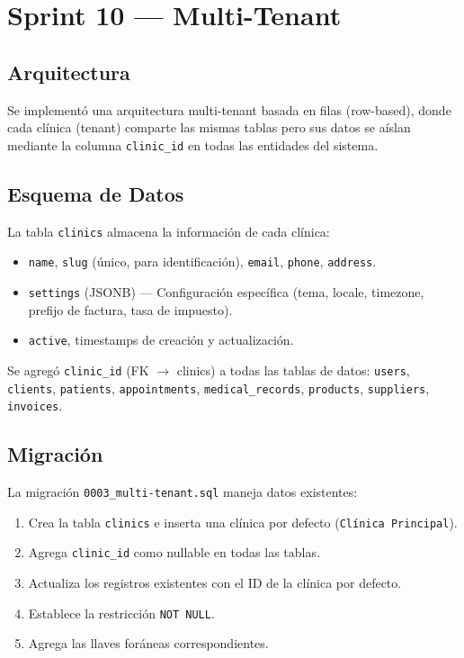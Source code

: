 \documentclass[12pt,a4paper]{article}
\begin{document}
\section{Sprint 10 --- Multi-Tenant}

\subsection{Arquitectura}

Se implementó una arquitectura multi-tenant basada en filas (row-based), donde
cada clínica (tenant) comparte las mismas tablas pero sus datos se aíslan
mediante la columna \texttt{clinic\_id} en todas las entidades del sistema.

\subsection{Esquema de Datos}

La tabla \texttt{clinics} almacena la información de cada clínica:

\begin{itemize}[leftmargin=*]
    \item \texttt{name}, \texttt{slug} (único, para identificación), \texttt{email},
          \texttt{phone}, \texttt{address}.
    \item \texttt{settings} (JSONB) --- Configuración específica (tema, locale,
          timezone, prefijo de factura, tasa de impuesto).
    \item \texttt{active}, timestamps de creación y actualización.
\end{itemize}

Se agregó \texttt{clinic\_id} (FK $\to$ clinics) a todas las tablas de datos:
\texttt{users}, \texttt{clients}, \texttt{patients}, \texttt{appointments},
\texttt{medical\_records}, \texttt{products}, \texttt{suppliers},
\texttt{invoices}.

\subsection{Migración}

La migración \texttt{0003\_multi-tenant.sql} maneja datos existentes:

\begin{enumerate}[leftmargin=*]
    \item Crea la tabla \texttt{clinics} e inserta una clínica por defecto
          (\texttt{Clínica Principal}).
    \item Agrega \texttt{clinic\_id} como nullable en todas las tablas.
    \item Actualiza los registros existentes con el ID de la clínica por defecto.
    \item Establece la restricción \texttt{NOT NULL}.
    \item Agrega las llaves foráneas correspondientes.
\end{enumerate}
\end{document}

